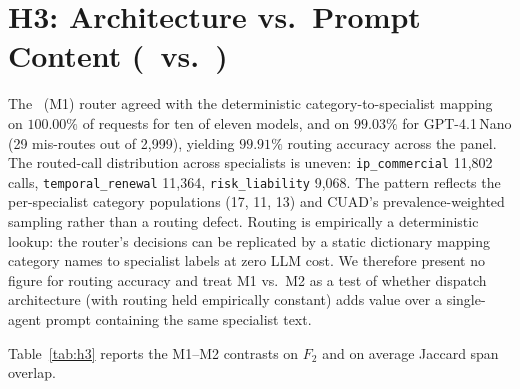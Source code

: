 \section{H3: Architecture vs.\ Prompt Content (\cfgMA\ vs.\ \cfgCP)}\label{sec:res:h3}

The \cfgMA\ (M1) router agreed with the deterministic category-to-specialist mapping on
$100.00\%$ of requests for ten of eleven models, and on $99.03\%$ for
GPT-4.1\,Nano (29 mis-routes out of 2{,}999), yielding $99.91\%$ routing
accuracy across the panel. The routed-call distribution across specialists is
uneven: \texttt{ip\_commercial} 11{,}802 calls, \texttt{temporal\_renewal}
11{,}364, \texttt{risk\_liability} 9{,}068. The pattern reflects the
per-specialist category populations (17, 11, 13) and CUAD's prevalence-weighted
sampling rather than a routing defect. Routing is empirically a deterministic lookup: the
router's decisions can be replicated by a static dictionary mapping category
names to specialist labels at zero LLM cost. We therefore present no figure for
routing accuracy and treat M1 vs.\ M2 as a test of whether dispatch architecture
(with routing held empirically constant) adds value over a single-agent
prompt containing the same specialist text.

Table~\ref{tab:h3} reports the M1--M2 contrasts on $F_2$ and on average
Jaccard span overlap.

